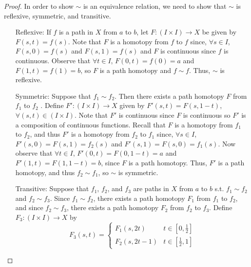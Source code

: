 \begin{proof}
	In order to show $\sim$ is an equivalence relation, we need to show that $\sim$ is reflexive, symmetric, and transitive. 
	\begin{itemize}
		\item[Reflexive:] If $f$ is a path in $X$ from $a$ to $b$, let $F: (I \times I) \rightarrow X$ be given by $F(s,t) = f(s)$. Note that $F$ is a homotopy from $f$ to $f$ since, $\forall s \in I$, $F(s,0) = f(s)$ and $F(s,1) = f(s)$ and $F$ is continuous since $f$ is continuous. Observe that $\forall t \in I$, $F(0, t) = f(0) = a$ and $F(1, t) = f(1) = b$, so $F$ is a path homotopy and $f \sim f$. Thus, $\sim$ is reflexive. 
		\item[Symmetric:] Suppose that $f_1 \sim f_2$. Then there exists a path homotopy $F$ from $f_1$ to $f_2$ . Define $F': (I \times I) \rightarrow X$ given by $F'(s,t) = F(s, 1-t)$, $\forall (s,t) \in (I \times I)$. Note that $F'$ is continuous since $F$ is continuous so $F'$ is a composition of continuous functions. Recall that $F$ is a homotopy from $f_1$ to $f_2$, and thus $F'$ is a homotopy from $f_2$ to $f_1$ since, $\forall s \in I$, $F'(s, 0) = F(s, 1) = f_2(s)$ and $F'(s, 1) = F(s, 0) = f_1(s)$. Now observe that $\forall t \in I$, $F'(0,t) = F(0,1-t) = a$ and $F'(1,t) = F(1, 1-t) = b$, since $F$ is a path homotopy. Thus, $F'$ is a path homotopy, and thus $f_2 \sim f_1$, so $\sim$ is symmetric. 
		\item [Transitive:] Suppose that $f_1$, $f_2$, and $f_3$ are paths in $X$ from $a$ to $b$ s.t. $f_1 \sim f_2$ and $f_2 \sim f_3$. Since $f_1 \sim f_2$, there exists a path homotopy $F_1$ from $f_1$ to $f_2$, and since $f_2 \sim f_3$, there exists a path homotopy $F_2$ from $f_2$ to $f_3$. Define $F_3: (I \times I) \rightarrow X$ by 
		\begin{displaymath}
			F_3(s,t) = 
			\begin{cases}
				F_1(s,2t) & t \in [0, \frac{1}{2}]\\
				F_2(s,2t - 1) & t \in [\frac{1}{2}, 1] 
			\end{cases}
		\end{displaymath}
		

\end{itemize}
\end{proof}
